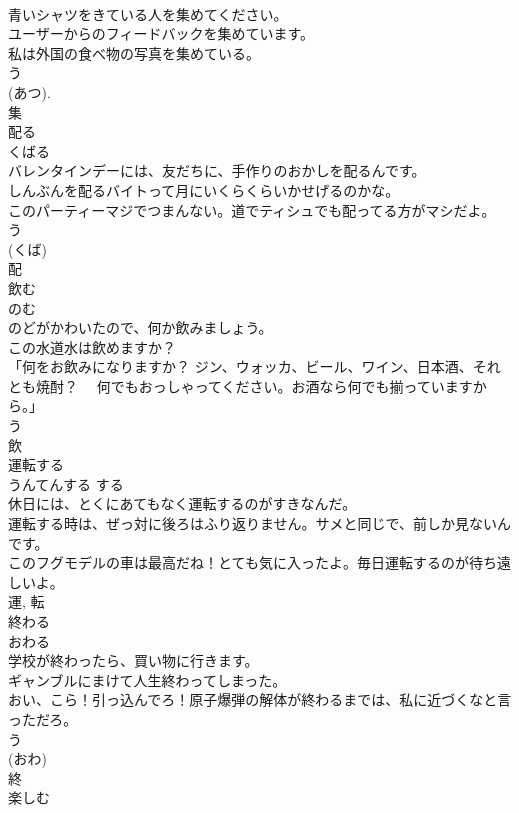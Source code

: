 \documentclass[8pt]{extreport}
\begin{document}
\begin{CJK}{UTF8}{min}
\\	青いシャツをきている人を集めてください。	
\\	ユーザーからのフィードバックを集めています。	
\\	私は外国の食べ物の写真を集めている。	
\\	う 
\\	(あつ). 
\\	集	
\\	配る	
\\	くばる	
\\	バレンタインデーには、友だちに、手作りのおかしを配るんです。	
\\	しんぶんを配るバイトって月にいくらくらいかせげるのかな。	
\\	このパーティーマジでつまんない。道でティシュでも配ってる方がマシだよ。	
\\	う 
\\	(くば) 
\\	配	
\\	飲む	
\\	のむ	
\\	のどがかわいたので、何か飲みましょう。	
\\	この水道水は飲めますか？	
\\	「何をお飲みになりますか？ ジン、ウォッカ、ビール、ワイン、日本酒、それとも焼酎？ 　何でもおっしゃってください。お酒なら何でも揃っていますから。」	
\\	う 
\\	飲	
\\	運転する	
\\	うんてんする	する 
\\	休日には、とくにあてもなく運転するのがすきなんだ。	
\\	運転する時は、ぜっ対に後ろはふり返りません。サメと同じで、前しか見ないんです。	
\\	このフグモデルの車は最高だね！とても気に入ったよ。毎日運転するのが待ち遠しいよ。	
\\	運, 転	
\\	終わる	
\\	おわる	
\\	学校が終わったら、買い物に行きます。	
\\	ギャンブルにまけて人生終わってしまった。	
\\	おい、こら！引っ込んでろ！原子爆弾の解体が終わるまでは、私に近づくなと言っただろ。	
\\	う 
\\	(おわ) 
\\	終	
\\	楽しむ	

\end{CJK}
\end{document}
